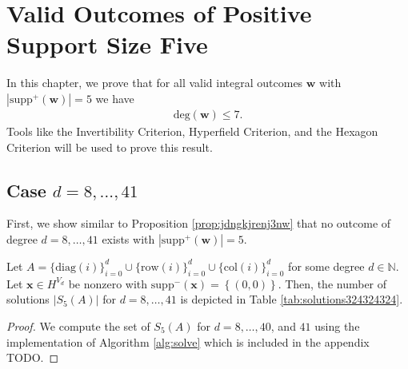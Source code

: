 \chapter{Valid Outcomes of Positive Support
Size Five}

In this chapter, we prove that for all valid integral outcomes \( \mathbf w \) with \( |\mathrm{supp}^+(\mathbf w)| = 5 \) we have
\begin{align*}
    \mathrm{deg}(\mathbf w) \leq 7.
\end{align*}
Tools like the Invertibility Criterion, Hyperfield Criterion, and the Hexagon Criterion will be used to prove this result.

\section{Case \( d = 8, \dots, 41 \)}

First, we show similar to Proposition \ref{prop:jdngkjrenj3nw} that no outcome of degree \( d = 8, \dots, 41 \) exists with \( |\mathrm{supp}^+(\mathbf w)| = 5 \).

\begin{proposition}
    Let $A = \{ \mathrm{diag}(i) \}_{i=0}^d \cup \{ \mathrm{row}(i)\}^d_{i=0} \cup \{ \mathrm{col}(i) \}^d_{i=0}$ for some degree \( d \in \mathbb{N} \). Let \( \mathbf{x} \in H^{V_d} \) be nonzero with \( \mathrm{supp}^-(\mathbf{x}) = \left\{ (0,0) \right\} \). Then, the number of solutions \( \lvert S_5(A) \rvert \) for \( d = 8, \dots, 41 \) is depicted in Table \ref{tab:solutions324324324}.
\end{proposition}

\begin{proof}
    We compute the set of \( S_5(A) \) for \( d = 8, \dots, 40 \), and \( 41 \) using the implementation of Algorithm \ref{alg:solve} which is included in the appendix TODO.
\end{proof}

